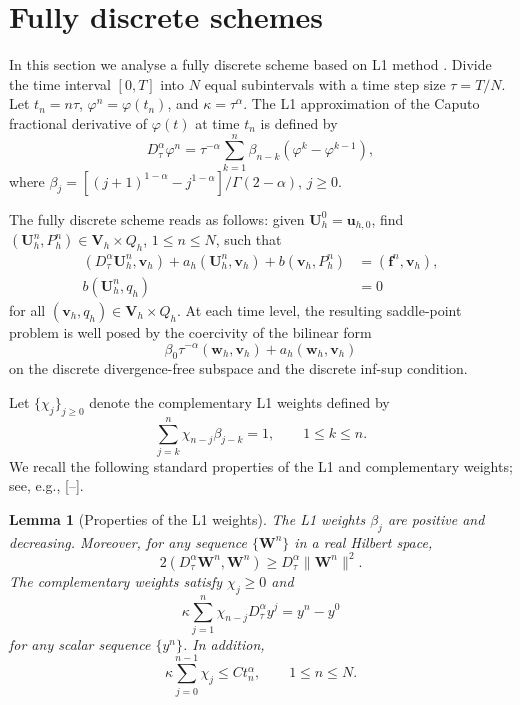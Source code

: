 \documentclass[11pt,a4paper]{article}
\numberwithin{equation}{section}
\theoremstyle{plain}
\newtheorem{lemma}[theorem]{Lemma}
\theoremstyle{definition}
\theoremstyle{remark}
\newcommand{\Dt}{D_\tau^{\alpha}}     %
\begin{document}
\section{Fully discrete schemes}
\label{sec:full}


In this section we analyse a fully discrete scheme based on L1 method \cite{LX}.
Divide the time interval $[0,T]$ into $N$ equal subintervals with a time step size
$\tau=T/N$. Let $t_n=n\tau$, $\varphi^n=\varphi(t_n)$, and
$\kappa=\tau^\alpha$.
The L1 approximation of the Caputo fractional derivative of $\varphi(t)$ at time $t_n$ is defined by
\begin{equation}
\label{eq:Dt}
\Dt \varphi^n
=
\tau^{-\alpha}\sum_{k=1}^n
\beta_{n-k}(\varphi^k-\varphi^{k-1}),
\end{equation}
where
$
\beta_j
=
[(j+1)^{1-\alpha}-j^{1-\alpha}]/\Gamma(2-\alpha),
\, j\ge0.
$

The fully discrete scheme reads as follows:
given $\bm U_h^0=\bm u_{h,0}$, find
$(\bm U_h^n,P_h^n)\in\bm V_h\times Q_h$,
$1\le n\le N$, such that
\begin{equation}
\label{eq:fd}
\begin{aligned}
(\Dt\bm U_h^n,\bm v_h)
+a_h(\bm U_h^n,\bm v_h)
+b(\bm v_h,P_h^n)
&=(\bm f^n,\bm v_h),\\
b(\bm U_h^n,q_h)&=0
\end{aligned}
\end{equation}
for all $(\bm v_h,q_h)\in\bm V_h\times Q_h$.
At each time level, the resulting saddle-point problem
is well posed by the coercivity of the bilinear form
\[
\beta_0\tau^{-\alpha}(\bm w_h,\bm v_h)
+a_h(\bm w_h,\bm v_h)
\]
on the discrete divergence-free subspace and the
discrete inf-sup condition.


Let $\{\chi_j\}_{j\ge0}$ denote the complementary
L1 weights defined by
\[
\sum_{j=k}^n\chi_{n-j}\beta_{j-k}=1,
\qquad 1\le k\le n.
\]
We recall the following standard properties of the L1
and complementary weights; see, e.g., [--].

\begin{lemma}[Properties of the L1 weights]
\label{lem:weights}
The L1 weights $\beta_j$ are positive and decreasing.
Moreover, for any sequence $\{\bm W^n\}$ in a real
Hilbert space,
\[
2(\Dt\bm W^n,\bm W^n)
\ge
\Dt\|\bm W^n\|^2.
\]
The complementary weights satisfy $\chi_j\ge0$ and
\[
\kappa\sum_{j=1}^n\chi_{n-j}\Dt y^j
=
y^n-y^0
\]
for any scalar sequence $\{y^n\}$. In addition,
\[
\kappa\sum_{j=0}^{n-1}\chi_j
\le Ct_n^\alpha,
\qquad 1\le n\le N.
\]
\end{lemma}
\end{document}
